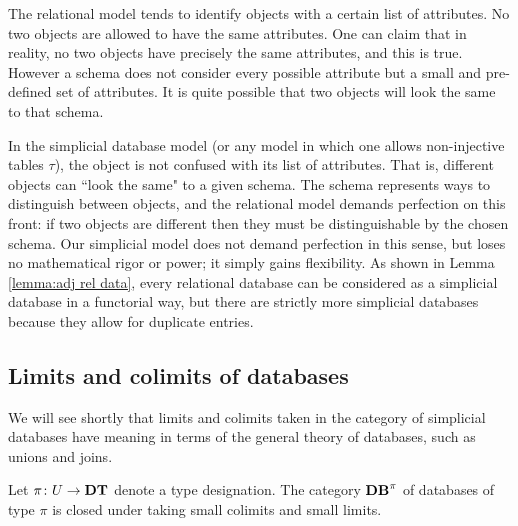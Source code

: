 \documentclass{amsart}
\def\DT{{\bf DT}}
\def\Data{{\bf DB}}
\begin{document}
The relational model tends to identify objects with a certain list of attributes.  No two objects are allowed to have the same attributes.  One can claim that in reality, no two objects have precisely the same attributes, and this is true.  However a schema does not consider every possible attribute but a small and pre-defined set of attributes.  It is quite possible that two objects will look the same to that schema. 

In the simplicial database model (or any model in which one allows non-injective tables $\tau$), the object is not confused with its list of attributes.  That is, different objects can ``look the same" to a given schema.  The schema represents ways to distinguish between objects, and the relational model demands perfection on this front: if two objects are different then they must be distinguishable by the chosen schema.  Our simplicial model does not demand perfection in this sense, but loses no mathematical rigor or power; it simply gains flexibility.  As shown in Lemma \ref{lemma:adj rel data}, every relational database can be considered as a simplicial database in a functorial way, but there are strictly more simplicial databases because they allow for duplicate entries.

\subsection{Limits and colimits of databases}

We will see shortly that limits and colimits taken in the category of simplicial databases have meaning in terms of the general theory of databases, such as unions and joins.  

\begin{theorem}\label{thm:colimits and limits}

Let $\pi\taking U\to\DT$ denote a type designation.  The category $\Data^\pi$ of databases of type $\pi$ is closed under taking small colimits and small limits.

\end{theorem}
\end{document}
